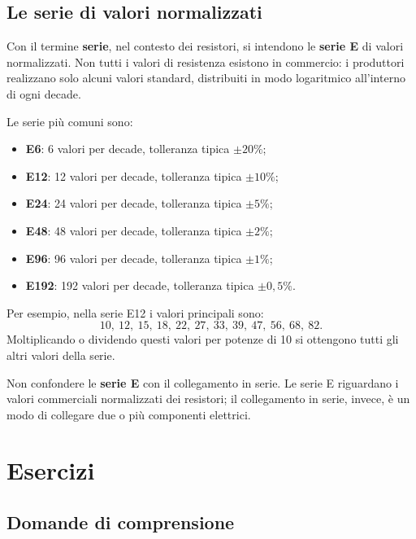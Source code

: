 \subsection{Le serie di valori normalizzati}

Con il termine \textbf{serie}, nel contesto dei resistori, si intendono le \textbf{serie E} di valori normalizzati. Non tutti i valori di resistenza esistono in commercio: i produttori realizzano solo alcuni valori standard, distribuiti in modo logaritmico all'interno di ogni decade.

Le serie più comuni sono:

\begin{itemize}[leftmargin=1cm]
  \item \textbf{E6}: 6 valori per decade, tolleranza tipica \(\pm 20\%\);
  \item \textbf{E12}: 12 valori per decade, tolleranza tipica \(\pm 10\%\);
  \item \textbf{E24}: 24 valori per decade, tolleranza tipica \(\pm 5\%\);
  \item \textbf{E48}: 48 valori per decade, tolleranza tipica \(\pm 2\%\);
  \item \textbf{E96}: 96 valori per decade, tolleranza tipica \(\pm 1\%\);
  \item \textbf{E192}: 192 valori per decade, tolleranza tipica \(\pm 0{,}5\%\).
\end{itemize}

Per esempio, nella serie E12 i valori principali sono:
\[
10,\ 12,\ 15,\ 18,\ 22,\ 27,\ 33,\ 39,\ 47,\ 56,\ 68,\ 82.
\]
Moltiplicando o dividendo questi valori per potenze di 10 si ottengono tutti gli altri valori della serie.

\begin{attenzione}
Non confondere le \textbf{serie E} con il collegamento in serie. Le serie E riguardano i valori commerciali normalizzati dei resistori; il collegamento in serie, invece, è un modo di collegare due o più componenti elettrici.
\end{attenzione}



\section{Esercizi}

\subsection{Domande di comprensione}


